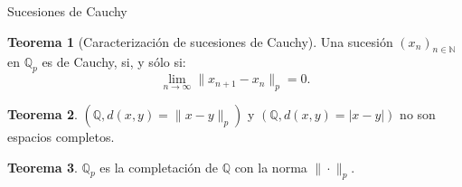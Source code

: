 \documentclass{beamer}
\theoremstyle{definition}
\numberwithin{equation}{section}
\newcommand{\orangee}[1]{\textcolor{thColor}{#1}}
\newtheorem{thh}{\orangee{Teorema}}
\newcommand{\N}{\mathbb{N}}
\newcommand{\Q}{\mathbb{Q}}
\newcommand{\Qp}{\mathbb{Q}_p}
\newcommand{\pnorm}[1]{\|#1\|_p}
\begin{document}
\begin{frame}{Sucesiones de Cauchy}
\begin{thh}
	[Caracterización de sucesiones de Cauchy]\label{car}
	Una sucesión $ (x_n)_{n\in\N}$ en $\Qp$ es de Cauchy, si, y sólo si:
	\begin{equation}\label{car_cau}
	\lim_{n\to\infty}\pnorm{x_{n+1}-x_n}=0.
	\end{equation}
\end{thh}
\begin{thh}
	$ (\Q, d (x,y)=\pnorm{x-y})$ y $ (\Q, d (x,y)=|x-y|)$ no son espacios completos.
\end{thh}
\begin{thh}
	$\Qp$ es la completación de $\Q$ con la norma $\pnorm{\cdot}$.
\end{thh}
\end{frame}
\end{document}
